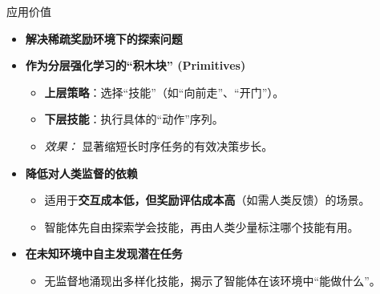 \documentclass{beamer}
\begin{document}
\begin{frame}{应用价值}

    \begin{itemize}
        \item \textbf{解决稀疏奖励环境下的探索问题}
        \vspace{0.5cm}

        \item \textbf{作为分层强化学习的“积木块” (Primitives)}
        \begin{itemize}
            \item \textbf{上层策略}：选择“技能”（如“向前走”、“开门”）。
            \item \textbf{下层技能}：执行具体的“动作”序列。
            \item \textit{效果：} 显著缩短长时序任务的有效决策步长。
        \end{itemize}
        \vspace{0.5cm}
        
        \item \textbf{降低对人类监督的依赖}
        \begin{itemize}
            \item 适用于\textbf{交互成本低，但奖励评估成本高}（如需人类反馈）的场景。
            \item 智能体先自由探索学会技能，再由人类少量标注哪个技能有用。
        \end{itemize}
        \vspace{0.5cm}
        
        \item \textbf{在未知环境中自主发现潜在任务}
        \begin{itemize}
            \item 无监督地涌现出多样化技能，揭示了智能体在该环境中“能做什么”。
        \end{itemize}
    \end{itemize}

\end{frame}
\end{document}
